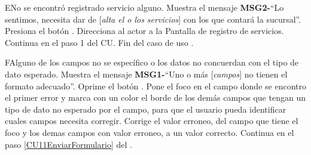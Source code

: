 		\begin{UCtrayectoriaA}{E}{No se encontró registrado servicio alguno.}
			\UCpaso Muestra el mensaje {\bf MSG2-}``Lo sentimos, necesita dar de [{\em alta el o los servicios}] con los que contará la sucursal''.
			\UCpaso[\UCactor] Presiona el botón .
			\UCpaso Direcciona al actor a la Pantalla de registro de servicios.
			\UCpaso Continua en el paso 1 del CU.
			Fin del caso de uso .
		\end{UCtrayectoriaA}		
		
		\begin{UCtrayectoriaA}{F}{Alguno de los campos no se específico o los datos no concuerdan con el tipo de dato esperado.}
			\UCpaso Muestra el mensaje {\bf MSG1-}``Uno o más [{\em campos}] no tienen el formato adecuado''.
			\UCpaso[\UCactor] Oprime el botón .
			\UCpaso Pone el foco en el campo donde se encontro el primer error y marca con un color el borde de los demás campos que tengan un tipo de dato no esperado por el campo, para que el usuario pueda identificar cuales campos necesita corregir. 
			\UCpaso[\UCactor] Corrige el valor erroneo, del campo que tiene el foco y los demas campos con valor erroneo, a un valor correcto.
			\UCpaso Continua en el paso \ref{CU11EnviarFormulario} del .
		\end{UCtrayectoriaA}
		
